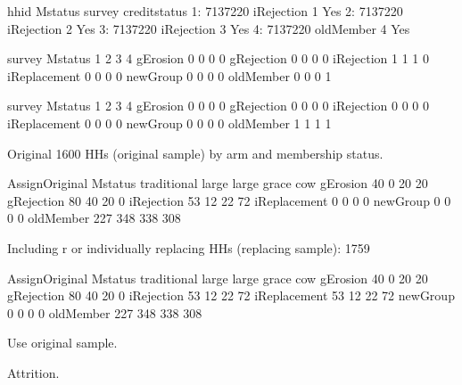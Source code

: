 \begin{Schunk}
\begin{Soutput}
      hhid    Mstatus survey creditstatus
1: 7137220 iRejection      1          Yes
2: 7137220 iRejection      2          Yes
3: 7137220 iRejection      3          Yes
4: 7137220  oldMember      4          Yes
\end{Soutput}
\begin{Soutput}
              survey
Mstatus        1 2 3 4
  gErosion     0 0 0 0
  gRejection   0 0 0 0
  iRejection   1 1 1 0
  iReplacement 0 0 0 0
  newGroup     0 0 0 0
  oldMember    0 0 0 1
\end{Soutput}
\begin{Soutput}
              survey
Mstatus        1 2 3 4
  gErosion     0 0 0 0
  gRejection   0 0 0 0
  iRejection   0 0 0 0
  iReplacement 0 0 0 0
  newGroup     0 0 0 0
  oldMember    1 1 1 1
\end{Soutput}
\end{Schunk}
Original 1600 HHs (original sample) by arm and membership status.
\begin{Schunk}
\begin{Soutput}
              AssignOriginal
Mstatus        traditional large large grace cow
  gErosion              40     0          20  20
  gRejection            80    40          20   0
  iRejection            53    12          22  72
  iReplacement           0     0           0   0
  newGroup               0     0           0   0
  oldMember            227   348         338 308
\end{Soutput}
\end{Schunk}
Including \textsf{r} or individually replacing HHs (replacing sample): 1759
\begin{Schunk}
\begin{Soutput}
              AssignOriginal
Mstatus        traditional large large grace cow
  gErosion              40     0          20  20
  gRejection            80    40          20   0
  iRejection            53    12          22  72
  iReplacement          53    12          22  72
  newGroup               0     0           0   0
  oldMember            227   348         338 308
\end{Soutput}
\end{Schunk}

Use original sample. \gobblepars

Attrition. %

